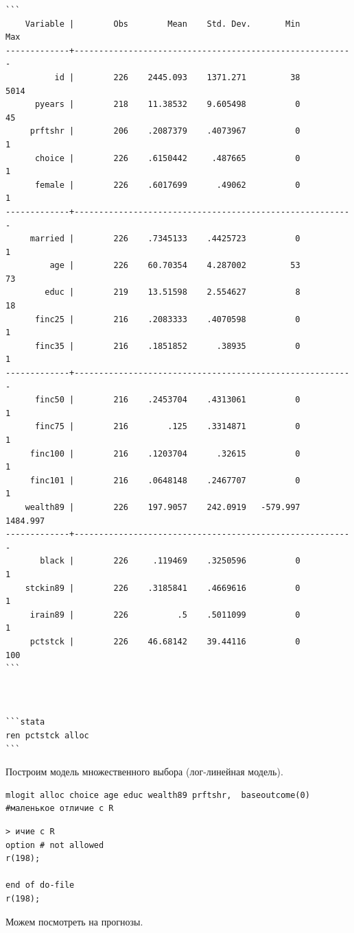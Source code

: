\documentclass[]{book}
\begin{document}
\begin{verbatim}
```
    Variable |        Obs        Mean    Std. Dev.       Min        Max
-------------+---------------------------------------------------------
          id |        226    2445.093    1371.271         38       5014
      pyears |        218    11.38532    9.605498          0         45
     prftshr |        206    .2087379    .4073967          0          1
      choice |        226    .6150442     .487665          0          1
      female |        226    .6017699      .49062          0          1
-------------+---------------------------------------------------------
     married |        226    .7345133    .4425723          0          1
         age |        226    60.70354    4.287002         53         73
        educ |        219    13.51598    2.554627          8         18
      finc25 |        216    .2083333    .4070598          0          1
      finc35 |        216    .1851852      .38935          0          1
-------------+---------------------------------------------------------
      finc50 |        216    .2453704    .4313061          0          1
      finc75 |        216        .125    .3314871          0          1
     finc100 |        216    .1203704      .32615          0          1
     finc101 |        216    .0648148    .2467707          0          1
    wealth89 |        226    197.9057    242.0919   -579.997   1484.997
-------------+---------------------------------------------------------
       black |        226     .119469    .3250596          0          1
    stckin89 |        226    .3185841    .4669616          0          1
     irain89 |        226          .5    .5011099          0          1
     pctstck |        226    46.68142    39.44116          0        100
```



```stata
ren pctstck alloc
```
\end{verbatim}

Построим модель множественного выбора (лог-линейная модель).

\begin{verbatim}
mlogit alloc choice age educ wealth89 prftshr,  baseoutcome(0) #маленькое отличие с R
\end{verbatim}

\begin{verbatim}
> ичие с R
option # not allowed
r(198);

end of do-file
r(198);
\end{verbatim}

Можем посмотреть на прогнозы.
\end{document}
